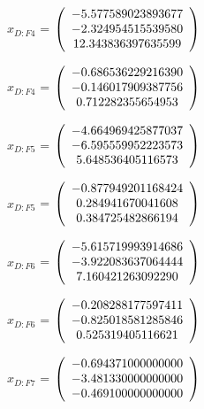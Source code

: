 \begin{description}
$x_{D:F4}$  = $\left( \begin{array} {ccc} -5.577589023893677 \\ -2.324954515539580 \\ 12.343836397635599
\end{array} \right)\\ \\$

$\hat{x}_{D:F4}$  = $\left( \begin{array} {ccc} -0.686536229216390 \\ -0.146017909387756 \\ 0.712282355654953
\end{array} \right)\\ \\$

$x_{D:F5}$  = $\left( \begin{array} {ccc} -4.664969425877037 \\ -6.595559952223573 \\ 5.648536405116573
\end{array} \right)\\ \\$

$\hat{x}_{D:F5}$  = $\left( \begin{array} {ccc} -0.877949201168424 \\ 0.284941670041608 \\ 0.384725482866194
\end{array} \right)\\ \\$

$x_{D:F6}$  = $\left( \begin{array} {ccc} -5.615719993914686 \\ -3.922083637064444 \\ 7.160421263092290
\end{array} \right)\\ \\$

$\hat{x}_{D:F6}$  = $\left( \begin{array} {ccc} -0.208288177597411 \\ -0.825018581285846 \\ 0.525319405116621
\end{array} \right)\\ \\$

$x_{D:F7}$  = $\left( \begin{array} {ccc} -0.694371000000000 \\ -3.481330000000000 \\ -0.469100000000000
\end{array} \right)\\ \\$


\end{description}
